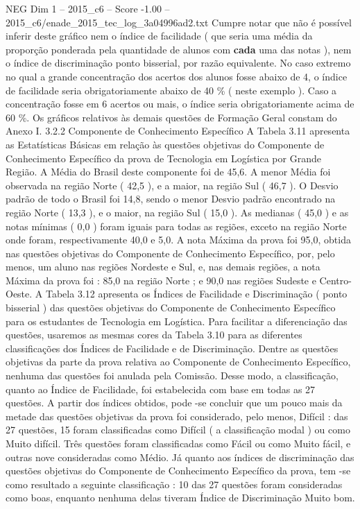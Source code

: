 \begin{textsample}{NEG Dim 1 – 2015\_c6 – Score -1.00 – 2015\_c6/enade\_2015\_tec\_log\_3a04996ad2.txt}
Cumpre notar que não é possível inferir deste gráfico nem o índice de facilidade ( que seria uma média da proporção ponderada pela quantidade de alunos com \textbf{cada} uma das notas ), nem o índice de discriminação ponto bisserial, por razão equivalente.
No caso extremo no qual a grande concentração dos acertos dos alunos fosse abaixo de 4, o índice de facilidade seria obrigatoriamente abaixo de 40 \% ( neste exemplo ).
Caso a concentração fosse em 6 acertos ou mais, o índice seria obrigatoriamente acima de 60 \%.
Os gráficos relativos às demais questões de Formação Geral constam do Anexo I. 3.2.2 Componente de Conhecimento Específico A Tabela 3.11 apresenta as Estatísticas Básicas em relação às questões objetivas do Componente de Conhecimento Específico da prova de Tecnologia em Logística por Grande Região.
A Média do Brasil deste componente foi de 45,6.
A menor Média foi observada na região Norte ( 42,5 ), e a maior, na região Sul ( 46,7 ).
O Desvio padrão de todo o Brasil foi 14,8, sendo o menor Desvio padrão encontrado na região Norte ( 13,3 ), e o maior, na região Sul ( 15,0 ).
As medianas ( 45,0 ) e as notas mínimas ( 0,0 ) foram iguais para todas as regiões, exceto na região Norte onde foram, respectivamente 40,0 e 5,0.
A nota Máxima da prova foi 95,0, obtida nas questões objetivas do Componente de Conhecimento Específico, por, pelo menos, um aluno nas regiões Nordeste e Sul, e, nas demais regiões, a nota Máxima da prova foi : 85,0 na região Norte ; e 90,0 nas regiões Sudeste e Centro-Oeste.
A Tabela 3.12 apresenta os Índices de Facilidade e Discriminação ( ponto bisserial ) das questões objetivas do Componente de Conhecimento Específico para os estudantes de Tecnologia em Logística.
Para facilitar a diferenciação das questões, usaremos as mesmas cores da Tabela 3.10 para as diferentes classificações dos Índices de Facilidade e de Discriminação.
Dentre as questões objetivas da parte da prova relativa ao Componente de Conhecimento Específico, nenhuma das questões foi anulada pela Comissão.
Desse modo, a classificação, quanto ao Índice de Facilidade, foi estabelecida com base em todas as 27 questões.
A partir dos índices obtidos, pode -se concluir que um pouco mais da metade das questões objetivas da prova foi considerado, pelo menos, Difícil : das 27 questões, 15 foram classificadas como Difícil ( a classificação modal ) ou como Muito difícil.
Três questões foram classificadas como Fácil ou como Muito fácil, e outras nove consideradas como Médio.
Já quanto aos índices de discriminação das questões objetivas do Componente de Conhecimento Específico da prova, tem -se como resultado a seguinte classificação : 10 das 27 questões foram consideradas como boas, enquanto nenhuma delas tiveram Índice de Discriminação Muito bom.

\end{textsample}
